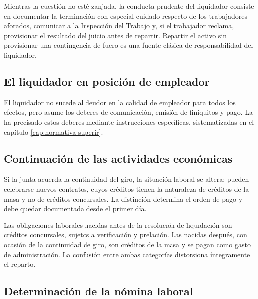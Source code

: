 \begin{foco}
Mientras la cuestión no esté zanjada, la conducta prudente del liquidador consiste en
documentar la terminación con especial cuidado respecto de los trabajadores aforados,
comunicar a la Inspección del Trabajo y, si el trabajador reclama, provisionar el
resultado del juicio antes de repartir. Repartir el activo sin provisionar una
contingencia de fuero es una fuente clásica de responsabilidad del liquidador.
\end{foco}

\subsection{El liquidador en posición de empleador}

El liquidador no sucede al deudor en la calidad de empleador para todos los efectos, pero
asume los deberes de comunicación, emisión de finiquitos y pago. La \superir{} ha
precisado estos deberes mediante instrucciones específicas, sistematizadas en el capítulo
\ref{cap:normativa-superir}.

\subsection{Continuación de las actividades económicas}

Si la junta acuerda la continuidad del giro, la situación laboral se altera: pueden
celebrarse nuevos contratos, cuyos créditos tienen la naturaleza de créditos de la masa y
no de créditos concursales. La distinción determina el orden de pago y debe quedar
documentada desde el primer día.

\begin{alerta}
Las obligaciones laborales nacidas antes de la resolución de liquidación son créditos
concursales, sujetos a verificación y prelación. Las nacidas después, con ocasión de la
continuidad de giro, son créditos de la masa y se pagan como gasto de administración. La
confusión entre ambas categorías distorsiona íntegramente el reparto.
\end{alerta}

\bloquePractico

\subsection{Determinación de la nómina laboral}

